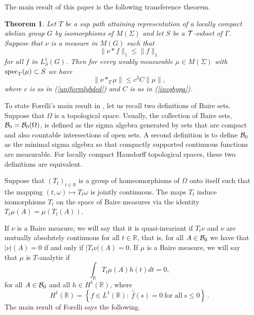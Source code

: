 \documentclass[12pt]{article}
\newcommand{\R}{\mathbb R}
\renewcommand{\O}{\Omega}
\newcommand{\cB}{{\cal B}}
\newcommand{\cT}{{\cal T}}
\newtheorem{thm}[defin]{Theorem}
\begin{document}
The main result of this paper is the following transference
theorem.
\begin{thm}
Let $T$ be a sup path attaining representation of a locally compact abelian group
$G$ by isomorphisms of $M(\Sigma)$ and let $S$ be a $\cT$-subset of
$\Gamma$.
Suppose that $\nu$ is a measure in $M(G)$ such that
\begin{equation}
\|\nu*f\|_1\leq \|f\|_1
\label{hyptransference2}
\end{equation}
for all $f$ in $L_S^1(G)$.  Then for every 
weakly measurable $\mu \in M(\Sigma)$ with
${\rm spec}_T ( \mu )\subset S$
we have
\begin{equation}
\|\nu*_T\mu\|\leq c^3 C \|\mu\|,
\label{conctransference2}
\end{equation}
where $c$ is as in (\ref{uniformlybded}) and 
$C$ is as in (\ref{ineqhypa}).
\label{maintransferenceth}
\end{thm}

To state Forelli's main result in \cite{forelli}, let us recall 
two definitions of Baire sets.  
Suppose that $\Omega$ is
a topological space. 
Usually,
the collection of Baire sets,\ $\cB_0=\cB_0(\O)$, is defined 
as the sigma algebra generated by sets that are compact and also countable
intersections of open sets.  A second definition is to define $\cB_0$
 as the minimal
sigma algebra so that compactly supported continuous functions are measurable.
For locally compact Hausdorff
topological spaces, these two
definitions are equivalent.

  Suppose that $(T_t)_{t\in \R}$ is a group of 
homeomorphisms
of $\Omega$ onto itself such that the mapping $(t,\omega) \mapsto T_t 
\omega$
is jointly continuous.  The maps $T_t$ induce isomorphisms $T_t$ on
the space of Baire measures via the identity $T_t \mu(A) = \mu(T_t(A))$.

If $\nu$ is a Baire measure, we will say that it is 
quasi-invariant if $T_t\nu$ and $\nu$ are mutually absolutely
continuous for all $t \in \R$, that is, for all $A \in \cB_0$ we have
that $|\nu|(A) = 0$ if and only if $|T_t\nu|(A) = 0$.  If $\mu$ is
a Baire measure, we will say that $\mu$ is $T$-analytic if
$$ \int_{\R} T_t\mu(A) h(t) dt = 0, $$
for all $A \in \cB_0$ and all $h \in H^1(\R)$, where
$$H^1(\R)=\left\{f\in L^1(\R):\ \widehat{f}(s)=0\ \mbox{for all}\ s\leq 0\right\}\,.$$ 
The main result of
Forelli \cite{forelli} says the following.
\end{document}
